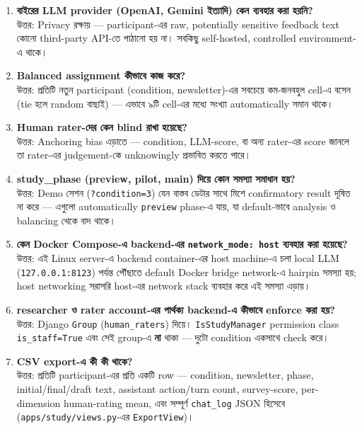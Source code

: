 \documentclass[11pt,a4paper]{article}
\newcommand{\code}[1]{\texttt{\small #1}}
\newcommand{\file}[1]{\texttt{\small #1}}
\begin{document}
\begin{enumerate}[leftmargin=*, label=\textbf{প্রশ্ন \arabic*.}]
\item \textbf{বাইরের LLM provider (OpenAI, Gemini ইত্যাদি) কেন ব্যবহার করা হয়নি?}\\
উত্তর: Privacy রক্ষায় --- participant-এর raw, potentially sensitive feedback text কোনো
third-party API-তে পাঠানো হয় না। সবকিছু self-hosted, controlled environment-এ থাকে।

\item \textbf{Balanced assignment কীভাবে কাজ করে?}\\
উত্তর: প্রতিটি নতুন participant (condition, newsletter)-এর সবচেয়ে কম-জনবহুল cell-এ বসেন (tie
হলে random বাছাই) --- এভাবে ৯টি cell-এর মধ্যে সংখ্যা automatically সমান থাকে।

\item \textbf{Human rater-দের কেন blind রাখা হয়েছে?}\\
উত্তর: Anchoring bias এড়াতে --- condition, LLM-score, বা অন্য rater-এর score জানলে তা
rater-এর judgement-কে unknowingly প্রভাবিত করতে পারে।

\item \textbf{study\_phase (preview, pilot, main) দিয়ে কোন সমস্যা সমাধান হয়?}\\
উত্তর: Demo সেশন (\code{?condition=3}) যেন বাস্তব ডেটার সাথে মিশে confirmatory result দূষিত
না করে --- এগুলো automatically \code{preview} phase-এ যায়, যা default-ভাবে analysis ও
balancing থেকে বাদ থাকে।

\item \textbf{কেন Docker Compose-এ backend-এর \code{network\_mode: host} ব্যবহার করা হয়েছে?}\\
উত্তর: এই Linux server-এ backend container-এর host machine-এ চলা local LLM
(\code{127.0.0.1:8123}) পর্যন্ত পৌঁছাতে default Docker bridge network-এ hairpin সমস্যা হয়;
host networking সরাসরি host-এর network stack ব্যবহার করে এই সমস্যা এড়ায়।

\item \textbf{researcher ও rater account-এর পার্থক্য backend-এ কীভাবে enforce করা হয়?}\\
উত্তর: Django \code{Group} (\code{human\_raters}) দিয়ে। \code{IsStudyManager} permission
class \code{is\_staff=True} এবং সেই group-এ \textbf{না} থাকা --- দুটো condition একসাথে check
করে।

\item \textbf{CSV export-এ কী কী থাকে?}\\
উত্তর: প্রতিটি participant-এর প্রতি একটি row --- condition, newsletter, phase,
initial/final/draft text, assistant action/turn count, survey-score, per-dimension human-rating
mean, এবং সম্পূর্ণ \code{chat\_log} JSON হিসেবে (\file{apps/study/views.py}-এর
\code{ExportView})।


\end{enumerate}
\end{document}
